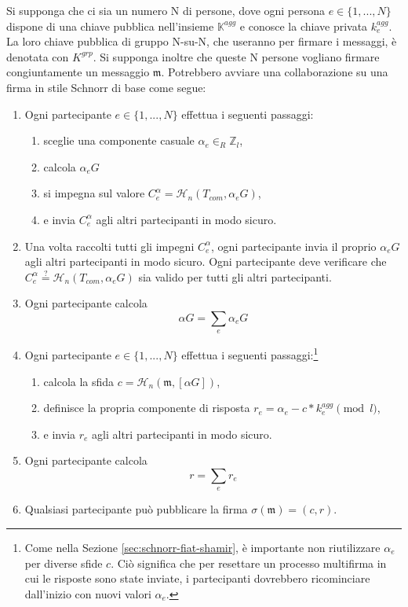 Si supponga che ci sia un numero N di persone, dove ogni persona $e \in \{1,...,N\}$ dispone di una chiave pubblica nell'insieme $\mathbb{K}^{agg}$ e conosce la chiave privata $k^{agg}_e$. La loro chiave pubblica di gruppo N-su-N, che useranno per firmare i messaggi, è denotata con $K^{grp}$. Si supponga inoltre che queste N persone vogliano firmare congiuntamente un messaggio $\mathfrak{m}$. Potrebbero avviare una collaborazione su una firma in stile Schnorr di base come segue:
\begin{enumerate}
    \item Ogni partecipante $e \in \{1,...,N\}$ effettua i seguenti passaggi:
    \begin{enumerate}
        \item sceglie una componente casuale $\alpha_e \in_R \mathbb{Z}_l$,
        \item calcola $\alpha_e G$
        \item si impegna sul valore $C^{\alpha}_e = \mathcal{H}_n(T_{com},\alpha_e G)$,
        \item e invia $C^{\alpha}_e$ agli altri partecipanti in modo sicuro.
    \end{enumerate}
    \item Una volta raccolti tutti gli impegni $C^{\alpha}_e$, ogni partecipante invia il proprio $\alpha_e G$ agli altri partecipanti in modo sicuro. Ogni partecipante deve verificare che $C^{\alpha}_e \stackrel{?}{=} \mathcal{H}_n(T_{com},\alpha_e G)$ sia valido per tutti gli altri partecipanti.
    \item Ogni partecipante calcola
    \[ \alpha G = \sum_e \alpha_e G \]
    \item Ogni partecipante $e \in \{1,...,N\}$ effettua i seguenti passaggi:\footnote{Come nella Sezione \ref{sec:schnorr-fiat-shamir}, è importante non riutilizzare $\alpha_e$ per diverse sfide $c$. Ciò significa che per resettare un processo multifirma in cui le risposte sono state inviate, i partecipanti dovrebbero ricominciare dall'inizio con nuovi valori $\alpha_e$.}
    \begin{enumerate}
        \item calcola la sfida $c = \mathcal{H}_n(\mathfrak{m},[\alpha G])$,
        \item definisce la propria componente di risposta $r_e = \alpha_e - c* k^{agg}_e \pmod l$,
        \item e invia $r_e$ agli altri partecipanti in modo sicuro.
    \end{enumerate}
    \item Ogni partecipante calcola
    \[ r = \sum_e r_e\]
    \item Qualsiasi partecipante può pubblicare la firma $\sigma(\mathfrak{m}) = (c,r)$.
\end{enumerate}


